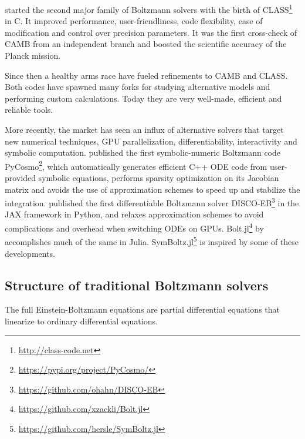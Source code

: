 \documentclass{aa}
\begin{document}
\cite{lesgourguesCosmicLinearAnisotropy2011,blasCosmicLinearAnisotropy2011a} started the second major family of Boltzmann solvers with the birth of CLASS\footnote{\url{http://class-code.net}\iffalse / \url{https://github.com/lesgourg/class_public}\fi} in C.
It improved performance, user-friendliness, code flexibility, ease of modification and control over precision parameters.
It was the first cross-check of CAMB from an independent branch and boosted the scientific accuracy of the Planck mission.

Since then a healthy arms race have fueled refinements to CAMB and CLASS.
Both codes have spawned many forks for studying alternative models and performing custom calculations. %
Today they are very well-made, efficient and reliable tools.

More recently, the market has seen an influx of alternative solvers that target new numerical techniques, GPU parallelization, differentiability, interactivity and symbolic computation.
\cite{refregierPyCosmoIntegratedCosmological2017a} published the first symbolic-numeric Boltzmann code PyCosmo\footnote{\url{https://pypi.org/project/PyCosmo/}}, which automatically generates efficient C++ ODE code from user-provided symbolic equations, performs sparsity optimization on its Jacobian matrix and avoids the use of approximation schemes to speed up and stabilize the integration.
\cite{hahnDISCODJDifferentiableEinsteinBoltzmann2024} published the first differentiable Boltzmann solver DISCO-EB\footnote{\url{https://github.com/ohahn/DISCO-EB}} in the JAX framework in Python, and relaxes approximation schemes to avoid complications and overhead when switching ODEs on GPUs.
Bolt.jl\footnote{\url{https://github.com/xzackli/Bolt.jl}} by \cite{liBoltjl2023} accomplishes much of the same in Julia.
SymBoltz.jl\footnote{\url{https://github.com/hersle/SymBoltz.jl}} is inspired by some of these developments. %

\subsection{Structure of traditional Boltzmann solvers}
\label{sec:intro_structure}

The full Einstein-Boltzmann equations are partial differential equations
that linearize to ordinary differential equations.
\end{document}
